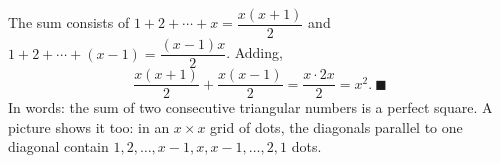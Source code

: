 The sum consists of $1+2+\cdots+x=\dfrac{x(x+1)}2$ and $1+2+\cdots+(x-1)=\dfrac{(x-1)x}2$. Adding,
\[\dfrac{x(x+1)}2+\dfrac{x(x-1)}2=\dfrac{x\cdot2x}{2}=x^2.\ \blacksquare\]
In words: the sum of two consecutive triangular numbers is a perfect square. A picture shows it too: in an $x\times x$ grid of dots, the diagonals parallel to one diagonal contain $1,2,\dots,x-1,x,x-1,\dots,2,1$ dots.
